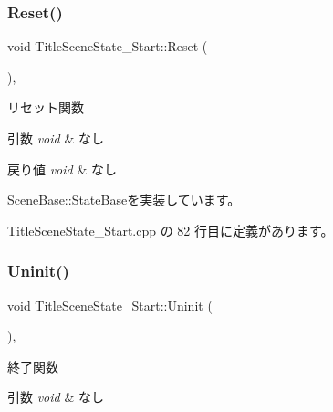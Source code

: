\subsubsection{\texorpdfstring{Reset()}{Reset()}}
{\footnotesize\ttfamily void Title\+Scene\+State\+\_\+\+Start\+::\+Reset (\begin{DoxyParamCaption}{ }\end{DoxyParamCaption})\hspace{0.3cm}{\ttfamily [override]}, {\ttfamily [virtual]}}



リセット関数 


\begin{DoxyParams}{引数}
{\em void} & なし \\
\hline
\end{DoxyParams}

\begin{DoxyRetVals}{戻り値}
{\em void} & なし \\
\hline
\end{DoxyRetVals}


\mbox{\hyperlink{class_scene_base_1_1_state_base_a2e14a3afece0b1d8db9edcebf514a977}{Scene\+Base\+::\+State\+Base}}を実装しています。



 Title\+Scene\+State\+\_\+\+Start.\+cpp の 82 行目に定義があります。

\mbox{\label{class_title_scene_state___start_a5bcb4d7a9250ea1c0041c38616ffabfe}} 
\subsubsection{\texorpdfstring{Uninit()}{Uninit()}}
{\footnotesize\ttfamily void Title\+Scene\+State\+\_\+\+Start\+::\+Uninit (\begin{DoxyParamCaption}{ }\end{DoxyParamCaption})\hspace{0.3cm}{\ttfamily [override]}, {\ttfamily [virtual]}}



終了関数 


\begin{DoxyParams}{引数}
{\em void} & なし \\
\hline
\end{DoxyParams}

